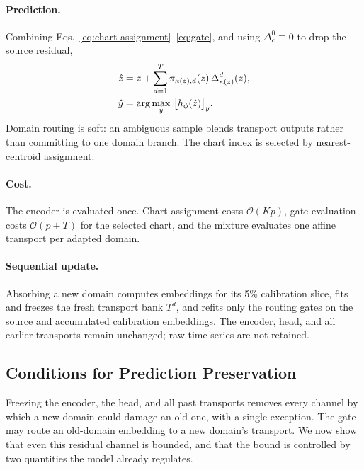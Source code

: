 \documentclass[letterpaper]{article} %
\begin{document}
\paragraph{Prediction.}
Combining Eqs.~\eqref{eq:chart-assignment}--\eqref{eq:gate}, and using
$\Delta^{0}_{c}\equiv 0$ to drop the source residual,
\begin{align}
\hat z
&=
z
+ \sum_{d=1}^{T} \pi_{\kappa(z),d}(z)\,
\Delta^{d}_{\kappa(z)}(z), \notag\\
\hat y
&= \arg\max_{y}\,\big[h_\phi(\hat z)\big]_y .
\label{eq:inference}
\end{align}
Domain routing is soft: an ambiguous sample blends transport outputs rather than
committing to one domain branch. The chart index is selected by nearest-centroid
assignment.

\paragraph{Cost.}
The encoder is evaluated once. Chart assignment costs $\mathcal{O}(Kp)$, gate
evaluation costs $\mathcal{O}(p+T)$ for the selected chart, and the mixture
evaluates one affine transport per adapted domain.

\paragraph{Sequential update.}
Absorbing a new domain computes embeddings for its 5\% calibration slice, fits
and freezes the fresh transport bank $T^d$, and refits only the routing gates on
the source and accumulated calibration embeddings. The encoder, head, and all
earlier transports remain unchanged; raw time series are not retained.

\subsection{Conditions for Prediction Preservation}
\label{sec:guarantee}

Freezing the encoder, the head, and all past transports removes every channel by
which a new domain could damage an old one, with a single exception. The gate may
route an old-domain embedding to a new domain's transport. We now show that even
this residual channel is bounded, and that the bound is controlled by two
quantities the model already regulates.
\end{document}
